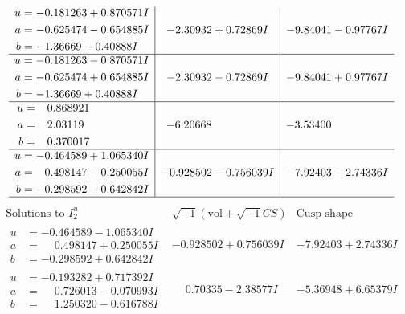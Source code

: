 \documentclass[1p]{elsarticle_modified}
\theoremstyle{definition}
\newcommand{\I}{\sqrt{-1}}
\begin{document}
$$\begin{array}{c|c|c}
\begin{aligned}
u &= -0.181263 + 0.870571 I \\
a &= -0.625474 - 0.654885 I \\
b &= -1.36669 - 0.40888 I\end{aligned}
 & -2.30932 + 0.72869 I & -9.84041 - 0.97767 I \\ \hline\begin{aligned}
u &= -0.181263 - 0.870571 I \\
a &= -0.625474 + 0.654885 I \\
b &= -1.36669 + 0.40888 I\end{aligned}
 & -2.30932 - 0.72869 I & -9.84041 + 0.97767 I \\ \hline\begin{aligned}
u &= \phantom{-}0.868921\phantom{ +0.000000I} \\
a &= \phantom{-}2.03119\phantom{ +0.000000I} \\
b &= \phantom{-}0.370017\phantom{ +0.000000I}\end{aligned}
 & -6.20668\phantom{ +0.000000I} & -3.53400\phantom{ +0.000000I} \\ \hline\begin{aligned}
u &= -0.464589 + 1.065340 I \\
a &= \phantom{-}0.498147 - 0.250055 I \\
b &= -0.298592 - 0.642842 I\end{aligned}
 & -0.928502 - 0.756039 I & -7.92403 - 2.74336 I\\
 \hline 
 \end{array}$$\newpage$$\begin{array}{c|c|c}  
\text{Solutions to }I^u_{2}& \I (\text{vol} + \sqrt{-1}CS) & \text{Cusp shape}\\
 \hline 
\begin{aligned}
u &= -0.464589 - 1.065340 I \\
a &= \phantom{-}0.498147 + 0.250055 I \\
b &= -0.298592 + 0.642842 I\end{aligned}
 & -0.928502 + 0.756039 I & -7.92403 + 2.74336 I \\ \hline\begin{aligned}
u &= -0.193282 + 0.717392 I \\
a &= \phantom{-}0.726013 - 0.070993 I \\
b &= \phantom{-}1.250320 - 0.616788 I\end{aligned}
 & \phantom{-}0.70335 - 2.38577 I & -5.36948 + 6.65379 I \\ \hline\begin{aligned}

\end{aligned}
\end{array}$$
\end{document}

